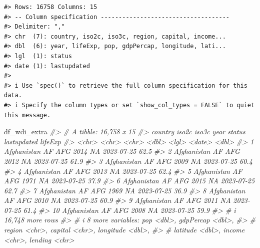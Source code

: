 \documentclass[
  xelatex, ja=standard]{bxjsbook}
\newenvironment{Shaded}{\begin{snugshade}}{\end{snugshade}}
\newcommand{\CommentTok}[1]{\textcolor[rgb]{0.56,0.35,0.01}{\textit{#1}}}
\newcommand{\NormalTok}[1]{#1}
\theoremstyle{definition}
\theoremstyle{definition}
\theoremstyle{definition}
\theoremstyle{definition}
\theoremstyle{remark}
\begin{document}
\begin{verbatim}
#> Rows: 16758 Columns: 15
#> -- Column specification ------------------------------------
#> Delimiter: ","
#> chr  (7): country, iso2c, iso3c, region, capital, income...
#> dbl  (6): year, lifeExp, pop, gdpPercap, longitude, lati...
#> lgl  (1): status
#> date (1): lastupdated
#> 
#> i Use `spec()` to retrieve the full column specification for this data.
#> i Specify the column types or set `show_col_types = FALSE` to quiet this message.
\end{verbatim}

\begin{Shaded}
\begin{Highlighting}[]
\NormalTok{df\_wdi\_extra}
\CommentTok{\#\textgreater{} \# A tibble: 16,758 x 15}
\CommentTok{\#\textgreater{}    country     iso2c iso3c  year status lastupdated lifeExp}
\CommentTok{\#\textgreater{}    \textless{}chr\textgreater{}       \textless{}chr\textgreater{} \textless{}chr\textgreater{} \textless{}dbl\textgreater{} \textless{}lgl\textgreater{}  \textless{}date\textgreater{}        \textless{}dbl\textgreater{}}
\CommentTok{\#\textgreater{}  1 Afghanistan AF    AFG    2014 NA     2023{-}07{-}25     62.5}
\CommentTok{\#\textgreater{}  2 Afghanistan AF    AFG    2012 NA     2023{-}07{-}25     61.9}
\CommentTok{\#\textgreater{}  3 Afghanistan AF    AFG    2009 NA     2023{-}07{-}25     60.4}
\CommentTok{\#\textgreater{}  4 Afghanistan AF    AFG    2013 NA     2023{-}07{-}25     62.4}
\CommentTok{\#\textgreater{}  5 Afghanistan AF    AFG    1971 NA     2023{-}07{-}25     37.9}
\CommentTok{\#\textgreater{}  6 Afghanistan AF    AFG    2015 NA     2023{-}07{-}25     62.7}
\CommentTok{\#\textgreater{}  7 Afghanistan AF    AFG    1969 NA     2023{-}07{-}25     36.9}
\CommentTok{\#\textgreater{}  8 Afghanistan AF    AFG    2010 NA     2023{-}07{-}25     60.9}
\CommentTok{\#\textgreater{}  9 Afghanistan AF    AFG    2011 NA     2023{-}07{-}25     61.4}
\CommentTok{\#\textgreater{} 10 Afghanistan AF    AFG    2008 NA     2023{-}07{-}25     59.9}
\CommentTok{\#\textgreater{} \# i 16,748 more rows}
\CommentTok{\#\textgreater{} \# i 8 more variables: pop \textless{}dbl\textgreater{}, gdpPercap \textless{}dbl\textgreater{},}
\CommentTok{\#\textgreater{} \#   region \textless{}chr\textgreater{}, capital \textless{}chr\textgreater{}, longitude \textless{}dbl\textgreater{},}
\CommentTok{\#\textgreater{} \#   latitude \textless{}dbl\textgreater{}, income \textless{}chr\textgreater{}, lending \textless{}chr\textgreater{}}
\end{Highlighting}
\end{Shaded}
\end{document}
